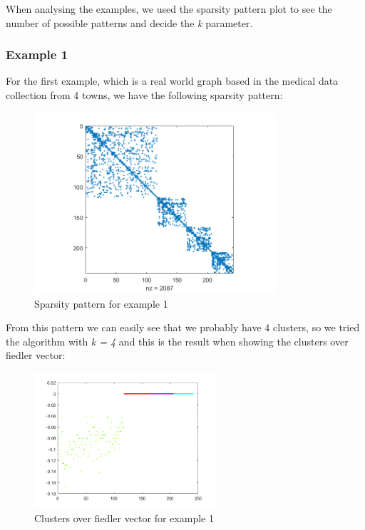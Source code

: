 \documentclass[12pt, a4paper]{article}
\begin{document}
When analysing the examples, we used the sparsity pattern plot to see the number of possible patterns and decide the \emph{k} parameter.

\subsubsection{Example 1}
For the first example, which is a real world graph based in the medical data collection from 4 towns, we have the following sparsity pattern:

\begin{figure}[H]
\centering
	\includegraphics[width=0.8\textwidth]{../plots/sparsity_ex1.png}
	\caption{Sparsity pattern for example 1}
\end{figure}

From this pattern we can easily see that we probably have 4 clusters, so we tried the algorithm with \emph{k = 4} and this is the result when showing the clusters over fiedler vector:

\begin{figure}[H]
\centering
	\includegraphics[width=0.6\textwidth]{../plots/clusters_ex1.png}
	\caption{Clusters over fiedler vector for example 1}
\end{figure}
\end{document}

